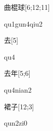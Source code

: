 \begin{verbete}{曲棍球}[6;12;11]
\begin{pronuncia}{qu1gun4qiu2}
\end{pronuncia}
\end{verbete}

\begin{verbete}[qu4]{去}[5]
\begin{pronuncia}{qu4}
\end{pronuncia}
\end{verbete}

\begin{verbete}[qu4nian2]{去年}[5;6]
\begin{pronuncia}{qu4nian2}
\end{pronuncia}
\end{verbete}

\begin{verbete}[qun2zi0]{裙子}[12;3]
\begin{pronuncia}{qun2zi0}
\end{pronuncia}
\end{verbete}

